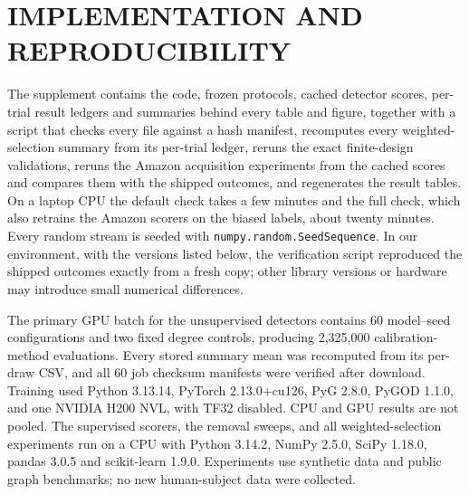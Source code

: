 \documentclass[twoside]{article}
\begin{document}
\clearpage

\clearpage\section{IMPLEMENTATION AND REPRODUCIBILITY}
\label{app:implementation}
The supplement contains the code, frozen protocols, cached detector scores, per-trial result ledgers and summaries behind every table and figure, together with a script that checks every file against a hash manifest, recomputes every weighted-selection summary from its per-trial ledger, reruns the exact finite-design validations, reruns the Amazon acquisition experiments from the cached scores and compares them with the shipped outcomes, and regenerates the result tables. On a laptop CPU the default check takes a few minutes and the full check, which also retrains the Amazon scorers on the biased labels, about twenty minutes. Every random stream is seeded with \texttt{numpy.random.SeedSequence}. In our environment, with the versions listed below, the verification script reproduced the shipped outcomes exactly from a fresh copy; other library versions or hardware may introduce small numerical differences.

The primary GPU batch for the unsupervised detectors contains 60 model--seed configurations and two fixed degree controls, producing 2,325,000 calibration-method evaluations. Every stored summary mean was recomputed from its per-draw CSV, and all 60 job checksum manifests were verified after download. Training used Python 3.13.14, PyTorch 2.13.0+cu126, PyG 2.8.0, PyGOD 1.1.0, and one NVIDIA H200 NVL, with TF32 disabled. CPU and GPU results are not pooled. The supervised scorers, the removal sweeps, and all weighted-selection experiments run on a CPU with Python 3.14.2, NumPy 2.5.0, SciPy 1.18.0, pandas 3.0.5 and scikit-learn 1.9.0. Experiments use synthetic data and public graph benchmarks; no new human-subject data were collected.
\end{document}
